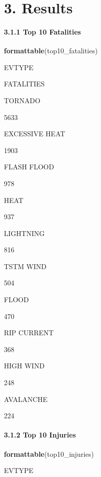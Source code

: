 \documentclass[]{article}
\newenvironment{Shaded}{\begin{snugshade}}{\end{snugshade}}
\newcommand{\KeywordTok}[1]{\textcolor[rgb]{0.13,0.29,0.53}{\textbf{#1}}}
\newcommand{\NormalTok}[1]{#1}
\let\oldparagraph\paragraph
\renewcommand{\paragraph}[1]{\oldparagraph{#1}\mbox{}}
\begin{document}
\hypertarget{results}{%
\section{3. Results}\label{results}}

\hypertarget{top-10-fatalities}{%
\paragraph{3.1.1 Top 10 Fatalities}\label{top-10-fatalities}}

\begin{Shaded}
\begin{Highlighting}[]
\KeywordTok{formattable}\NormalTok{(top10_fatalities)}
\end{Highlighting}
\end{Shaded}

EVTYPE

FATALITIES

TORNADO

5633

EXCESSIVE HEAT

1903

FLASH FLOOD

978

HEAT

937

LIGHTNING

816

TSTM WIND

504

FLOOD

470

RIP CURRENT

368

HIGH WIND

248

AVALANCHE

224

\hypertarget{top-10-injuries}{%
\paragraph{3.1.2 Top 10 Injuries}\label{top-10-injuries}}

\begin{Shaded}
\begin{Highlighting}[]
\KeywordTok{formattable}\NormalTok{(top10_injuries)}
\end{Highlighting}
\end{Shaded}

EVTYPE
\end{document}
